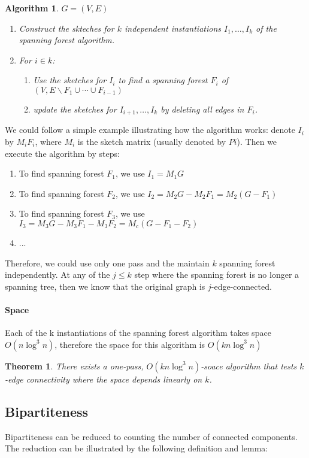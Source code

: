 \documentclass[11pt]{article}
\theoremstyle{plain}
\newtheorem{theorem}{Theorem}[section]
\newtheorem{algorithm}{Algorithm}[section]
\begin{document}
\begin{algorithm}
	\label{al:kconnect}
$G=(V,E)$
\begin{enumerate}
	\item Construct the skteches for $k$ independent instantiations $I_1, \dots, 
	I_k$ of the spanning forest algorithm. 
	\item For $i\in k$: 
		\begin{enumerate}
			\item Use the sketches for $I_i$ to find a spanning forest $F_i$ of $(V, 
			E\backslash F_1\cup\cdots\cup F_{i-1})$
			\item update the sketches for $I_{i+1}, \dots, I_{k}$ by deleting all edges 
			in $F_i$. 
		\end{enumerate}
\end{enumerate}
\end{algorithm}

We could follow a simple example illustrating how the algorithm works: denote 
$I_i$ by $M_iF_i$, where $M_i$ is the sketch matrix (usually denoted by $Pi$). 
Then we execute the algorithm by steps:
\begin{enumerate}
	\item To find spanning forest $F_1$, we use $I_1=M_1G$
	\item To find spanning forest $F_2$, we use $I_2=M_2G-M_2F_1=M_2(G-F_1)$
		\item To find spanning forest $F_3$, we use 
		$I_3=M_3G-M_3F_1-M_3F_2=M_c(G-F_1-F_2)$
		\item ...
\end{enumerate}
Therefore, we could use only one pass and the maintain $k$ spanning forest 
independently. At any of the $j \leq k$ step where the spanning forest is no 
longer a spanning tree, then we know that the original graph is 
$j$-edge-connected.

\paragraph{Space} Each of the k instantiations of the spanning forest 
algorithm takes space  $O(n\log^3 n)$, therefore the space for this algorithm is  
$O(kn\log^3 n)$

\begin{theorem}
There exists a one-pass,  $O(kn\log^3 n)$-soace algorithm that tests $k$-edge 
connectivity where the space depends linearly on $k$.
\end{theorem}


\subsection{Bipartiteness}
Bipartiteness can be reduced to counting the number of connected components. 
The reduction can be illustrated by the following definition and lemma:
\end{document}
